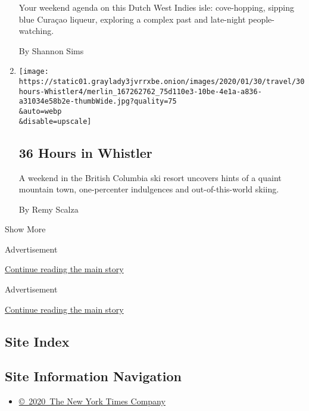 \begin{enumerate}
  Your weekend agenda on this Dutch West Indies isle: cove-hopping,
  sipping blue Curaçao liqueur, exploring a complex past and late-night
  people-watching.

  By Shannon Sims
\item
  \href{/2020/01/30/travel/what-to-do-36-hours-in-whistler-british-columbia.html}{}

  \texttt{[image: https://static01.graylady3jvrrxbe.onion/images/2020/01/30/travel/30hours-Whistler4/merlin\_167262762\_75d110e3-10be-4e1a-a836-a31034e58b2e-thumbWide.jpg?quality=75\\\&auto=webp\\\&disable=upscale]}

  \hypertarget{36-hours-in-whistler}{%
  \subsection{36 Hours in Whistler}\label{36-hours-in-whistler}}

  A weekend in the British Columbia ski resort uncovers hints of a
  quaint mountain town, one-percenter indulgences and out-of-this-world
  skiing.

  By Remy Scalza
\end{enumerate}

Show More

Advertisement

\protect\hyperlink{after-mid1}{Continue reading the main story}

Advertisement

\protect\hyperlink{after-mktg}{Continue reading the main story}

\hypertarget{site-index}{%
\subsection{Site Index}\label{site-index}}

\hypertarget{site-information-navigation}{%
\subsection{Site Information
Navigation}\label{site-information-navigation}}

\begin{itemize}
\tightlist
\item
  \href{https://help.nytimes3xbfgragh.onion/hc/en-us/articles/115014792127-Copyright-notice}{©~2020~The
  New York Times Company}
\end{itemize}

